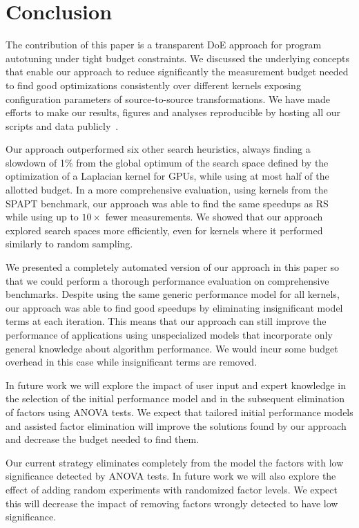 \documentclass[conference]{IEEEtran}
\begin{document}
\section{Conclusion}
\label{sec:org578743a}
The contribution of this paper is a transparent DoE approach for program
autotuning under tight budget constraints. We discussed the underlying concepts
that enable our approach to reduce significantly the measurement budget needed
to find good optimizations consistently over different kernels exposing
configuration parameters of source-to-source transformations. We have made
efforts to make our results, figures and analyses reproducible by hosting all
our scripts and data publicly~\cite{bruel2018ccgrid19}.

Our approach outperformed six other search heuristics, always finding a slowdown
of 1\% from the global optimum of the search space defined by the optimization of
a Laplacian kernel for GPUs, while using at most half of the allotted budget. In
a more comprehensive evaluation, using kernels from the SPAPT benchmark, our
approach was able to find the same speedups as RS while using up to \(10\times\)
fewer measurements. We showed that our approach explored search spaces more
efficiently, even for kernels where it performed similarly to random sampling.

We presented a completely automated version of our approach in this paper so
that we could perform a thorough performance evaluation on comprehensive
benchmarks. Despite using the same generic performance model for all kernels,
our approach was able to find good speedups by eliminating insignificant model
terms at each iteration. This means that our approach can still improve the
performance of applications using unspecialized models that incorporate only
general knowledge about algorithm performance. We would incur some budget
overhead in this case while insignificant terms are removed.

In future work we will explore the impact of user input and expert knowledge in
the selection of the initial performance model and in the subsequent elimination
of factors using ANOVA tests. We expect that tailored initial performance models
and assisted factor elimination will improve the solutions found by our approach
and decrease the budget needed to find them.

Our current strategy eliminates completely from the model the factors with low
significance detected by ANOVA tests. In future work we will also explore the
effect of adding random experiments with randomized factor levels. We expect
this will decrease the impact of removing factors wrongly detected to have low
significance.
\end{document}
